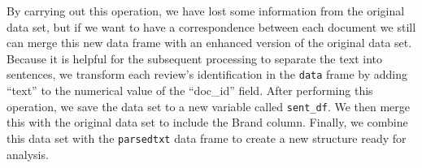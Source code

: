 \begin{Shaded}
\begin{Highlighting}[]
\OtherTok{\textless{}{-}} \SpecialCharTok{$}
\end{Highlighting}
\end{Shaded}

By carrying out this operation, we have lost some information from the original
data set, but if we want to have a correspondence between each document
we still can merge this new data frame with an enhanced
version of the original data set. Because it is helpful for
the subsequent processing to separate the text into sentences, we transform
each review's identification in the \texttt{data} frame by adding
``text'' to the numerical value of the ``doc\_id'' field. After
performing this operation, we save the data set to a new variable called
\texttt{sent\_df}. We then merge this with the original data set to
include the Brand column. Finally, we combine this data set with the
\texttt{parsedtxt} data frame to create a new structure ready for
analysis.

